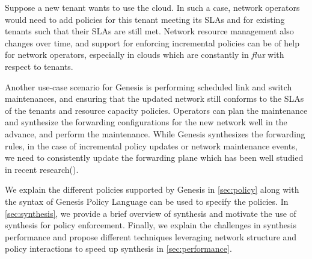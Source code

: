 \documentclass[]{sig}
\begin{document}
Suppose a new tenant wants to use the cloud. In such a case, network operators would need to add policies for this tenant meeting its SLAs and for existing tenants such that their SLAs are still met. Network resource management also changes over time, and support for enforcing incremental policies can be of help for network operators, especially in clouds which are constantly in \emph{flux} with respect to tenants. 

Another use-case scenario for Genesis is performing scheduled link and switch maintenances, and ensuring that the updated network still conforms to the SLAs of the tenants and resource capacity policies. Operators can plan the maintenance and synthesize the forwarding configurations for the new network well in the advance, and perform the maintenance. While Genesis synthesizes the forwarding rules, in the case of incremental policy updates or network maintenance events, we need to consistently update the forwarding plane which has been well studied in recent research(\cite{updates}).   

We explain the different policies supported by Genesis in \cref{sec:policy} along with the syntax of Genesis Policy Language can be used to specify the policies. In \cref{sec:synthesis}, we provide a brief overview of synthesis and motivate the use of synthesis for policy enforcement. Finally, we explain the challenges in synthesis performance and propose different techniques leveraging network structure and policy interactions to speed up synthesis in \cref{sec:performance}.
\end{document}
